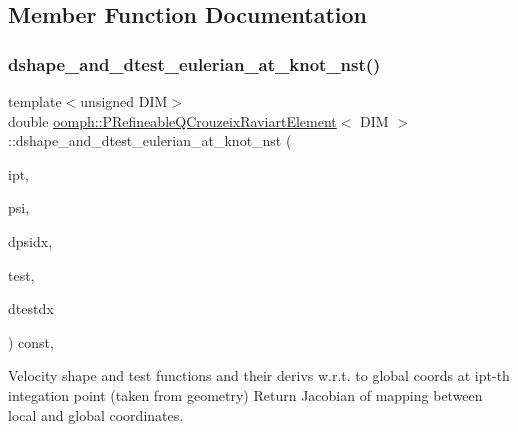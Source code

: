 \subsection{Member Function Documentation}
\mbox{\label{classoomph_1_1PRefineableQCrouzeixRaviartElement_ab11329961821573134dcc4d97b0b61f0}} 
\subsubsection{\texorpdfstring{dshape\+\_\+and\+\_\+dtest\+\_\+eulerian\+\_\+at\+\_\+knot\+\_\+nst()}{dshape\_and\_dtest\_eulerian\_at\_knot\_nst()}\hspace{0.1cm}{\footnotesize\ttfamily [1/3]}}
{\footnotesize\ttfamily template$<$unsigned D\+IM$>$ \\
double \hyperlink{classoomph_1_1PRefineableQCrouzeixRaviartElement}{oomph\+::\+P\+Refineable\+Q\+Crouzeix\+Raviart\+Element}$<$ D\+IM $>$\+::dshape\+\_\+and\+\_\+dtest\+\_\+eulerian\+\_\+at\+\_\+knot\+\_\+nst (\begin{DoxyParamCaption}\item[{const unsigned \&}]{ipt,  }\item[{\hyperlink{classoomph_1_1Shape}{Shape} \&}]{psi,  }\item[{\hyperlink{classoomph_1_1DShape}{D\+Shape} \&}]{dpsidx,  }\item[{\hyperlink{classoomph_1_1Shape}{Shape} \&}]{test,  }\item[{\hyperlink{classoomph_1_1DShape}{D\+Shape} \&}]{dtestdx }\end{DoxyParamCaption}) const\hspace{0.3cm}{\ttfamily [inline]}, {\ttfamily [virtual]}}



Velocity shape and test functions and their derivs w.\+r.\+t. to global coords at ipt-\/th integation point (taken from geometry) Return Jacobian of mapping between local and global coordinates. 



